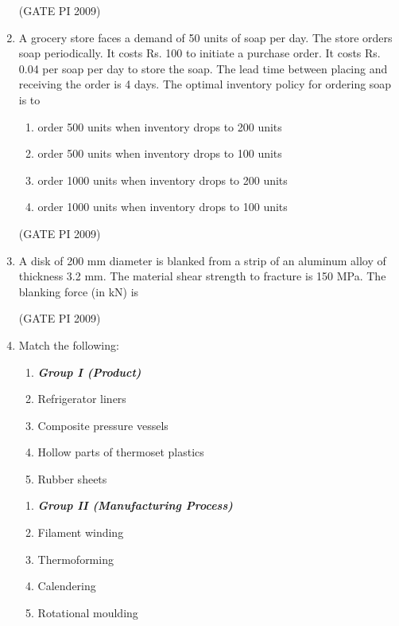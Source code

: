 \documentclass[journal,12pt,onecolumn]{IEEEtran}
\theoremstyle{remark}
\begin{document}
\begin{enumerate}
\hfill (GATE PI 2009)
\item A grocery store faces a demand of 50 units of soap per day. The store orders soap periodically. It costs Rs. 100 to initiate a purchase order. It costs Rs. 0.04 per soap per day to store the soap. The lead time between placing and receiving the order is 4 days. The optimal inventory policy for ordering soap is to
\begin{enumerate}
\item order 500 units when inventory drops to 200 units 
\item order 500 units when inventory drops to 100 units
\item order 1000 units when inventory drops to 200 units
\item order 1000 units when inventory drops to 100 units
\end{enumerate}
\hfill (GATE PI 2009)
\item A disk of 200 mm diameter is blanked from a strip of an aluminum alloy of thickness 3.2 mm. The material shear strength to fracture is 150 MPa. The blanking force (in kN) is

\begin{enumerate}
\end{enumerate}

\hfill (GATE PI 2009)
\newpage 
\item Match the following:

\noindent
\begin{multicols}{2}
\begin{enumerate}[label=\Alph*.]
    \item[]  \textit{\textbf{Group I (Product)}}
    \item Refrigerator liners
    \item Composite pressure vessels
    \item Hollow parts of thermoset plastics
    \item Rubber sheets
\end{enumerate}
\columnbreak
\begin{enumerate}[label=\arabic*.]
    \item[] \textit{\textbf{Group II (Manufacturing Process)}}
    \item Filament winding
    \item Thermoforming
    \item Calendering
    \item Rotational moulding
\end{enumerate}
\end{multicols}



\end{enumerate}
\end{document}
